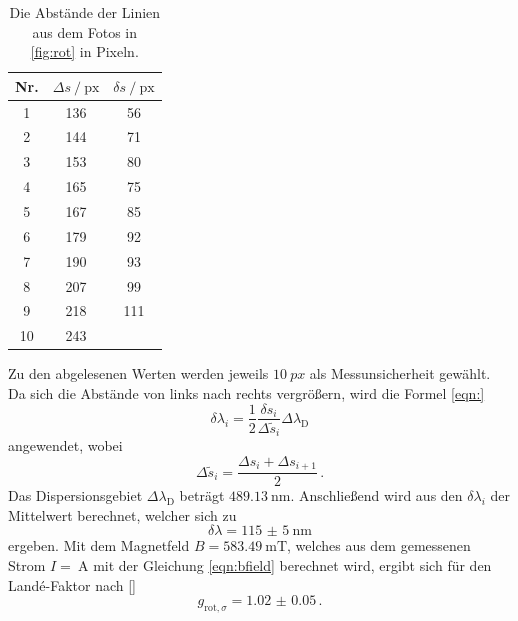   \begin{table}
    \centering
    \caption{Die Abstände der Linien aus dem Fotos in \autoref{fig:rot} in Pixeln.}
    \label{tab:rotsigmas}
    \begin{tabular}{c S[table-format=3.0] S[table-format=3.0]}
      \toprule
      {Nr.} & {$\Delta s \mathbin{/} \text{px}$} & {$\delta s \mathbin{/} \text{px}$} \\
        &  136   &   56\\
       2  &  144   &   71\\
       3  &  153   &   80\\
       4  &  165   &   75\\
       5  &  167   &   85\\
       6  &  179   &   92\\
       7  &  190   &   93\\
       8  &  207   &   99\\
       9  &  218   &   111\\
      10  &  243     \\
      \bottomrule
    \end{tabular}
  \end{table}

  \noindent Zu den abgelesenen Werten werden jeweils $\SI{10}{px}$ als Messunsicherheit gewählt. Da sich die Abstände von links nach rechts vergrößern,
  wird die Formel \eqref{eqn:}
  \begin{equation*}
    \delta \lambda_i = \frac{1}{2} \frac{\delta s_i}{\Delta \tilde{s}_i} \Delta \lambda_\text{D}
  \end{equation*}
  angewendet, wobei 
  \begin{equation*}
    \Delta \tilde{s}_i = \frac{\Delta s_i + \Delta s_{i+1}}{2}\, .
  \end{equation*}
  Das Dispersionsgebiet $\Delta \lambda_\text{D}$ beträgt $\SI{489.13}{\nano\metre}$. 
  Anschließend wird aus den $\delta \lambda_i$ der Mittelwert berechnet, welcher sich zu 
  \begin{equation*}
    \delta \lambda = \SI{115(5)}{\nano\metre}
  \end{equation*}
  ergeben. 
  Mit dem Magnetfeld $B= \SI{583.49}{\milli\tesla}$, welches aus dem gemessenen Strom $I = \SI{}{\ampere}$ mit der Gleichung \eqref{eqn:bfield} berechnet wird, 
  ergibt sich für den Land\'{e}-Faktor nach \eqref{}
  \begin{equation*}
    g_{\text{rot}, \sigma} = \num{1.02(5)}\, .
  \end{equation*}

